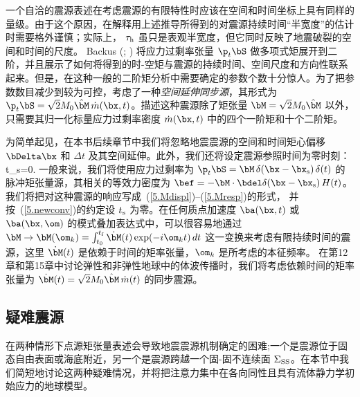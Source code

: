 一个自洽的震源表述在考虑震源的有限特性时应该在空间和时间坐标上具有同样的量级。由于这个原因，在解释用上述推导所得到的对震源持续时间“半宽度”的估计时需要格外谨慎；实际上， $\tau_{\rm h}$ 虽只是表观半宽度，但它同时反映了地震破裂的空间和时间的尺度。
Backus (\citeyear{backus77a}; \citeyear{backus77b}) 将应力过剩率张量
$\p_t\bS$ 做多项式矩展开到二阶，并且展示了如何将得到的时-空矩与震源的持续时间、空间尺度和方向性联系起来。但是，在这种一般的二阶矩分析中需要确定的参数个数十分惊人。为了把参数数目减少到较为可控，\textcite{bukchin94}考虑了一种{\em 空间延伸同步源\/}，其形式为
%
%
%
$\p_t\bS=\sqrt{2}M_0\hat{\bM}_{\,}\dot{m}(\bx,t)$。描述这种震源除了矩张量 $\bM=\sqrt{2}M_0\hat{\bM}$ 以外，只需要其归一化标量应力过剩率密度
$\dot{m}(\bx,t)$ 中的四个一阶矩和十个二阶矩。

为简单起见，在本书后续章节中我们将忽略地震震源的空间和时间矩心偏移
$\bDelta\bx$ 和 $\Delta t$ 及其空间延伸。此外，我们还将设定震源参照时间为零时刻：
\eq \label{5.newconv}
t_{\rm s}=0.
\en
一般来说，我们将使用应力过剩率为 $\p_t\bS=\bM\,\delta(\bx-\bx_{\rm s})
\,\delta(t)$ 的脉冲矩张量源，其相关的等效力密度为 
$\bef=-\bM\cdot\bdel\delta(\bx-\bx_{\rm s})\,H(t)$。
我们将把对这种震源的响应写成~(\ref{5.Mdispl})--(\ref{5.Mresp})的形式，
并按~(\ref{5.newconv})的约定设 $t_{\rm s}$ 为零。在任何质点加速度 $\ba(\bx,t)$ 或 $\ba(\bx,\om)$ 的模式叠加表达式中，可以很容易地通过
$\bM\rightarrow\bM(\om_k)=
\int_{t_0}^{t_{\rm f}}\dot{\bM}(t)\exp(-i\om_kt)\,dt$ 这一变换来考虑有限持续时间的震源，这里
$\dot{\bM}(t)$ 是依赖于时间的矩率张量，$\om_k$ 是所考虑的本征频率。
在第12章和第15章中讨论弹性和非弹性地球中的体波传播时，我们将考虑依赖时间的矩率张量为
$\dot{\bM}(t)=\sqrt{2}M_0\hat{\bM}\,\dot{m}(t)$ 的同步震源。
%

\renewcommand{\thesubsection}{$\!\!\!\raise1.3ex\hbox{$\star$}\!\!$
\arabic{chapter}.\arabic{section}.\arabic{subsection}}
\subsection{疑难震源}
\renewcommand{\thesubsection}{\arabic{chapter}.\arabic{section}.\arabic{subsection}}

在两种情形下点源矩张量表述会导致地震震源机制确定的困难;一个是震源位于固态自由表面或海底附近，另一个是震源跨越一个固-固不连续面 $\Sigma_{\rm SS}$。在本节中我们简短地讨论这两种疑难情况，并将把注意力集中在各向同性且具有流体静力学初始应力的地球模型。

